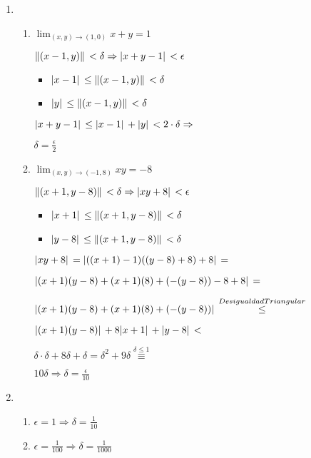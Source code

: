 \documentclass[../practica_03.tex]{subfiles}
\begin{document}
    \begin{enumerate}

        \item 
            \begin{enumerate}
                \item $\lim_{(x,y)\to(1,0)} x + y = 1$

                    $ \norm*{(x-1,y)} < \delta \Rightarrow \abs*{x+y - 1} < \epsilon $

                    \begin{itemize}
                        \item $ \abs*{x-1} \leq \norm*{(x-1,y)} < \delta $
                        \item $ \abs*{y} \leq \norm*{(x-1,y)} < \delta $
                    \end{itemize}

                    $\abs*{x+y-1} \leq \abs*{x-1} + \abs*{y} < 2\cdot\delta \Rightarrow$

                    $\delta = \frac{\epsilon}{2}$

                \item $\lim_{(x,y)\to(-1,8)} xy = -8$
                
                    $\norm*{(x+1,y-8)} < \delta \Rightarrow \abs*{xy+8} < \epsilon$

                    \begin{itemize}
                        \item $ \abs*{x+1} \leq \norm*{(x+1,y-8)} < \delta $
                        \item $ \abs*{y-8} \leq \norm*{(x+1,y-8)} < \delta $
                    \end{itemize}

                    $\abs*{xy+8} = \abs*{((x+1)-1)((y-8)+8) +8} =  $

                    $\abs*{(x+1)(y-8) + (x+1)(8) + (-(y-8)) - 8 +8} =  $

                    $\abs*{(x+1)(y-8) + (x+1)(8) + (-(y-8))} \stackrel{DesigualdadTriangular}{\leq} $

                    $\abs*{(x+1)(y-8)} + 8\abs*{x+1} +\abs*{y-8} < $

                    $ \delta\cdot\delta + 8\delta + \delta  = \delta^2 + 9\delta \stackrel{\delta \leq 1}{\equiv}$

                    $ 10\delta \Rightarrow \delta = \frac{\epsilon}{10}$
            \end{enumerate}

        \item
            \begin{enumerate}

                \item $\epsilon = 1 \Rightarrow \delta = \frac{1}{10}$

                \item $\epsilon = \frac{1}{100}\Rightarrow \delta = \frac{1}{1000}$

            \end{enumerate}

    \end{enumerate}
\end{document}
